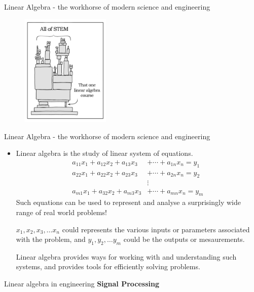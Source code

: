 \documentclass[aspectratio=169]{beamer}
\let\olditem\item
\renewcommand{\item}{\setlength{\itemsep}{\fill}\olditem}
\begin{document}
\begin{frame}[t]{Linear Algebra - the workhorse of modern science and engineering}
\begin{figure}
  \centering 
  \includegraphics[width=0.38\textwidth]{../../truth.png}
\end{figure}
\end{frame}


\begin{frame}[t]{Linear Algebra - the workhorse of modern science and engineering}
\begin{itemize}
  \item Linear algebra is the study of linear system of equations.
  \[
    \begin{split}
      a_{11} x_1 + a_{12} x_2 + a_{13} x_3 &+ \cdots + a_{1n} x_n = y_1\\
      a_{22} x_1 + a_{22} x_2 + a_{23} x_3 &+ \cdots + a_{2n} x_n = y_2\\
      &\vdots \\ 
      a_{m1} x_1 + a_{32} x_2 + a_{m3} x_3 &+ \cdots + a_{mn} x_n = y_m
    \end{split}
  \]
  Such equations can be used to represent and analyse a surprisingly wide range of real world problems!
  \vspace{0.2cm}
  
  $x_1, x_2, x_3, \ldots x_n$ could represents the various inputs or parameters associated with the problem, and $y_1, y_2, \ldots y_m$ could be the outputs or mesaurements.
  \vspace{0.2cm}
  
  Linear algebra provides ways for working with and understanding such systems, and provides tools for efficiently solving problems.
\end{itemize}
\end{frame}


\begin{frame}{Linear algebra in engineering}
  \textbf{Signal Processing}
  
\end{frame}
\end{document}
